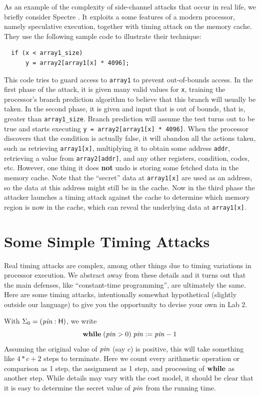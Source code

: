 \documentclass[11pt]{article}
\begin{document}
As an example of the complexity of side-channel attacks that occur in real life,
we briefly consider Spectre \citep{Kocher19sp}.  It exploits a some features of
a modern processor, namely speculative execution, together with timing attack on
the memory cache.  They use the following sample code to illustrate their
technique:
\begin{verbatim}
  if (x < array1_size)
      y = array2[array1[x] * 4096];
\end{verbatim}
This code tries to guard access to \verb'array1' to prevent out-of-bounds
access.  In the first phase of the attack, it is given many valid values for
\verb'x', training the processor's branch prediction algorithm to believe that
this branch will usually be taken.  In the second phase, it is given and input
that is out of bounds, that is, greater than \verb'array1_size'.  Branch
prediction will assume the test turns out to be true and starts executing
\verb'y = array2[array1[x] * 4096]'.  When the processor discovers that the
condition is actually false, it will abandon all the actions taken, such as
retrieving \verb'array1[x]', multiplying it to obtain some address \verb'addr',
retrieving a value from \verb'array2[addr]', and any other registers, condition,
codes, etc.  However, one thing it does \textbf{not} undo is storing some
fetched data in the memory cache.  Note that the ``secret'' data at
\verb'array1[x]' are used as an address, so the data at this address might still
be in the cache.  Now in the third phase the attacker launches a timing attack
against the cache to determine which memory region is now in the cache, which
can reveal the underlying data at \verb'array1[x]'.

\section{Some Simple Timing Attacks}

Real timing attacks \citep{Brumley05cn} are complex, among other things due to
timing variations in processor execution.  We abstract away from these details
and it turns out that the main defenses, like ``constant-time programming'', are
ultimately the same.  Here are some timing attacks, intentionally somewhat
hypothetical (slightly outside our language) to give you the opportunity to
devise your own in Lab 2.

With $\Sigma_0 = (\mathit{pin} : \mathsf{H})$, we write
\[
  \mathbf{while}\; (\mathit{pin} > 0)\; \mathit{pin} := \mathit{pin} - 1
\]
Assuming the original value of $\mathit{pin}$ (say $c$) is positive, this will take
something like $4 * c + 2$ steps to terminate.  Here we count every arithmetic
operation or comparison as 1 step, the assignment as 1 step, and processing of
$\mathbf{while}$ as another step.  While details may vary with the cost model, it
should be clear that it is easy to determine the secret value of $\mathit{pin}$ from
the running time.
\end{document}
